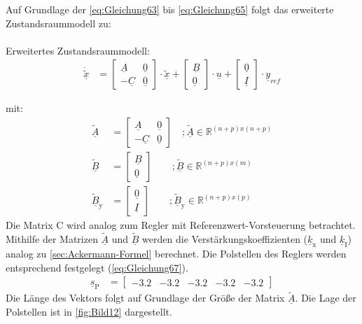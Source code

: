 \newline
Auf Grundlage der \autoref{eq:Gleichung63} bis \autoref{eq:Gleichung65} folgt das erweiterte Zustandsraummodell zu:\\\\
Erweitertes Zustandsraummodell:
\begin{align}\label{eq:Gleichung66}
    \underline{\dot{\tilde{x}}} &= 
    \begin{bmatrix}
        \underline{A} & \underline{0} \\
        -\underline{C} & \underline{0}
    \end{bmatrix} \cdot \underline{\tilde{x}} +
    \begin{bmatrix}
        \underline{B} \\
        \underline{0}
    \end{bmatrix} \cdot\underline{u} +
    \begin{bmatrix}
        \underline{0} \\
        \underline{I}
    \end{bmatrix} \cdot\underline{y}_{ref}
\end{align}

\clearpage

mit:
\begin{align*}
    \underline{\tilde{A}} &= 
    \begin{bmatrix}
        \underline{A} & \underline{0} \\
        -\underline{C} & \underline{0}
    \end{bmatrix} \quad ; \underline{\tilde{A}}\in\mathbb{R}^{(n+p)x(n+p)}\\
    \underline{\tilde{B}} &= 
    \begin{bmatrix}
        \underline{B} \\
        \underline{0}
    \end{bmatrix}\qquad ; \underline{\tilde{B}}\in\mathbb{R}^{(n+p)x(m)}\\
    \underline{\tilde{B}}_{\mathrm{y}} &= 
    \begin{bmatrix}
        \underline{0} \\
        \underline{I}
    \end{bmatrix}\qquad  ;\underline{\tilde{B}}_{\mathrm{y}}\in\mathbb{R}^{(n+p)x(p)}
\end{align*}
\newline
Die Matrix C wird analog zum Regler mit Referenzwert-Vorsteuerung betrachtet. Mithilfe der Matrizen $\underline{\tilde{A}}$ und $\underline{\tilde{B}}$ werden die Verstärkungskoeffizienten ($\underline{k}_{\mathrm{x}}$ und $\underline{k}_{\mathrm{I}}$) analog zu \autoref{sec:Ackermann-Formel} berechnet. Die Polstellen des Reglers werden entsprechend festgelegt (\autoref{eq:Gleichung67}).
\begin{align}\label{eq:Gleichung67}
    \underline{s}_{\mathrm{P}} &= 
    \begin{bmatrix}
        -3.2 & -3.2 & -3.2 & -3.2 & -3.2
    \end{bmatrix}
\end{align}
\newline
Die Länge des Vektors folgt auf Grundlage der Größe der Matrix $\underline{\tilde{A}}$. Die Lage der Polstellen ist in \autoref{fig:Bild12} dargestellt.

